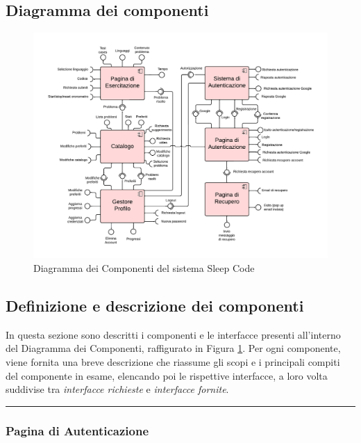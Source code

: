 \documentclass[11pt, a4paper]{article}
\theoremstyle{definition} %
\begin{document}
\subsection{Diagramma dei componenti}
\begin{figure}[H]
\centering
\hspace*{-3cm}
\includegraphics[scale = 0.86]{materiale/componentdiagram.pdf}
\caption{Diagramma dei Componenti del sistema Sleep Code}
\label{compdiagram}
\end{figure}

\newpage
\subsection{Definizione e descrizione dei componenti}
In questa sezione sono descritti i componenti e le interfacce presenti
all'interno del Diagramma dei Componenti, raffigurato in Figura \ref{compdiagram}.
Per ogni componente, viene fornita una breve descrizione che riassume gli
scopi e i principali compiti del componente in esame, elencando poi
le rispettive interfacce, a loro volta suddivise tra \textit{interfacce
richieste} e \textit{interfacce fornite}.

\begin{center}
    \rule{5cm}{1pt}
\end{center}

\subsubsection{Pagina di Autenticazione}
\end{document}
